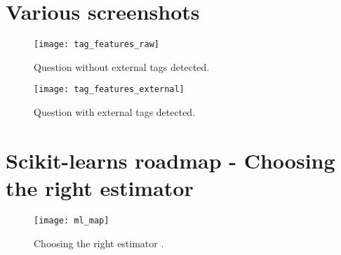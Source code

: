\begin{comment}
td-10l-unprocessed-up-numeric
------------------------------------
Classification Report:
			Precision	Recall		F1-score	Support
-1.0       0.81      0.90      0.85      1154
1.0       0.79      0.62      0.69       651
avg / total       0.80      0.80      0.80      1805


td-10l-unprocessed-up-tags
------------------------------------
Classification Report:
			Precision	Recall		F1-score	Support
-1.0       0.80      0.79      0.79      1985
1.0       0.79      0.80      0.80      2009
avg / total       0.79      0.79      0.79      3994
\end{lstlisting}

\end{comment}
				
\clearpage
\section{Various screenshots}
\label{app:various_screenshots}
\begin{figure}[ht]
	\centering
	\texttt{[image: tag\_features\_raw]}
	\caption{Question without external tags detected.}
	\label{fig:tag_features_raw}
\end{figure}
\begin{figure}[ht]
	\centering
	\texttt{[image: tag\_features\_external]}
	\caption{Question with external tags detected.}
	\label{fig:tag_features_external}
\end{figure}

\clearpage
\section{Scikit-learns roadmap - Choosing the right estimator}
\label{app:ml_map}
\begin{figure}[ht]
	\centering
	\texttt{[image: ml\_map]}
	\caption[Choosing the right estimator]{Choosing the right estimator \cite{Scikitlearn.org2016i}.}
	\label{fig:ml_map}
\end{figure}

\clearpage
